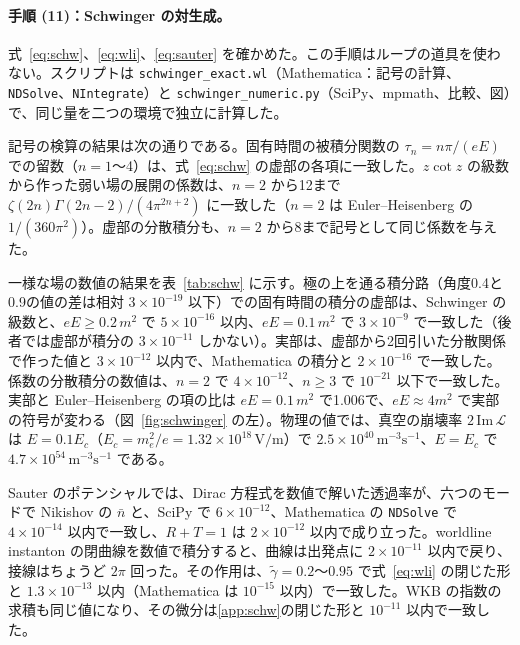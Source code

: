 \documentclass[a4paper,10pt]{ltjsarticle}
\begin{document}
\paragraph{手順 (11)：Schwinger の対生成。}式~\eqref{eq:schw}、\eqref{eq:wli}、\eqref{eq:sauter} を確かめた。この手順はループの道具を使わない。スクリプトは \texttt{schwinger\_exact.wl}（Mathematica：記号の計算、\texttt{NDSolve}、\texttt{NIntegrate}）と \texttt{schwinger\_numeric.py}（SciPy、mpmath、比較、図）で、同じ量を二つの環境で独立に計算した。

記号の検算の結果は次の通りである。固有時間の被積分関数の $\tau_n=n\pi/(eE)$ での留数（$n=1$〜4）は、式~\eqref{eq:schw} の虚部の各項に一致した。$z\cot z$ の級数から作った弱い場の展開の係数は、$n=2$ から12まで $\zeta(2n)\Gamma(2n-2)/(4\pi^{2n+2})$ に一致した（$n=2$ は Euler--Heisenberg の $1/(360\pi^2)$）。虚部の分散積分も、$n=2$ から8まで記号として同じ係数を与えた。

一様な場の数値の結果を表~\ref{tab:schw} に示す。極の上を通る積分路（角度0.4と0.9の値の差は相対 $3\times10^{-19}$ 以下）での固有時間の積分の虚部は、Schwinger の級数と、$eE\ge0.2\,m^2$ で $5\times10^{-16}$ 以内、$eE=0.1\,m^2$ で $3\times10^{-9}$ で一致した（後者では虚部が積分の $3\times10^{-11}$ しかない）。実部は、虚部から2回引いた分散関係で作った値と $3\times10^{-12}$ 以内で、Mathematica の積分と $2\times10^{-16}$ で一致した。係数の分散積分の数値は、$n=2$ で $4\times10^{-12}$、$n\ge3$ で $10^{-21}$ 以下で一致した。実部と Euler--Heisenberg の項の比は $eE=0.1\,m^2$ で1.006で、$eE\approx4m^2$ で実部の符号が変わる（図~\ref{fig:schwinger} の左）。物理の値では、真空の崩壊率 $2\,\mathrm{Im}\,\mathcal L$ は $E=0.1E_c$（$E_c=m_e^2/e=1.32\times10^{18}\,\mathrm{V/m}$）で $2.5\times10^{40}\,\mathrm{m^{-3}s^{-1}}$、$E=E_c$ で $4.7\times10^{54}\,\mathrm{m^{-3}s^{-1}}$ である。

Sauter のポテンシャルでは、Dirac 方程式を数値で解いた透過率が、六つのモードで Nikishov の $\bar n$ と、SciPy で $6\times10^{-12}$、Mathematica の \texttt{NDSolve} で $4\times10^{-14}$ 以内で一致し、$R+T=1$ は $2\times10^{-12}$ 以内で成り立った。worldline instanton の閉曲線を数値で積分すると、曲線は出発点に $2\times10^{-11}$ 以内で戻り、接線はちょうど $2\pi$ 回った。その作用は、$\tilde\gamma=0.2$〜$0.95$ で式~\eqref{eq:wli} の閉じた形と $1.3\times10^{-13}$ 以内（Mathematica は $10^{-15}$ 以内）で一致した。WKB の指数の求積も同じ値になり、その微分は\ref{app:schw}の閉じた形と $10^{-11}$ 以内で一致した。
\end{document}
